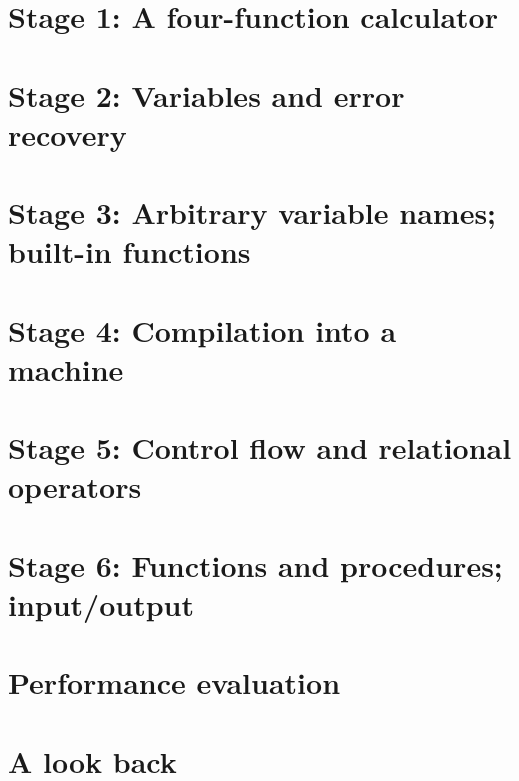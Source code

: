 \section{Stage 1: A four-function calculator}
\section{Stage 2: Variables and error recovery}
\section{Stage 3: Arbitrary variable names; built-in functions}
\section{Stage 4: Compilation into a machine}
\section{Stage 5: Control flow and relational operators}
\section{Stage 6: Functions and procedures; input/output}
\section{Performance evaluation}
\section{A look back}
